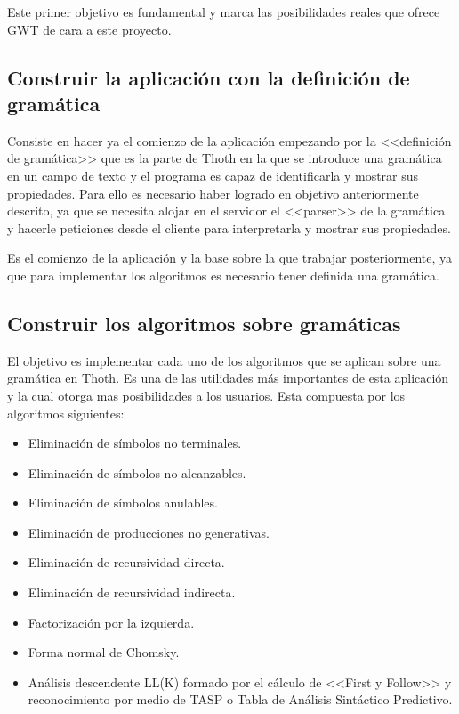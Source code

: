 Este primer objetivo es fundamental y marca las posibilidades reales que ofrece GWT de cara a este proyecto.

\subsection{Construir la aplicación con la definición de gramática}

Consiste en hacer ya el comienzo de la aplicación empezando por la <<definición de gramática>> que es la parte de Thoth en la que se introduce una gramática en un campo de texto y el programa es capaz de identificarla y mostrar sus propiedades. Para ello es necesario haber logrado en objetivo anteriormente descrito, ya que se necesita alojar en el servidor el <<parser>> de la gramática y hacerle peticiones desde el cliente para interpretarla y mostrar sus propiedades.

Es el comienzo de la aplicación y la base sobre la que trabajar posteriormente, ya que para implementar los algoritmos es necesario tener definida una gramática.

\subsection{Construir los algoritmos sobre gramáticas}

El objetivo es implementar cada uno de los algoritmos que se aplican sobre una gramática en Thoth. Es una de las utilidades más importantes de esta aplicación y la cual otorga mas posibilidades a los usuarios. Esta compuesta por los algoritmos siguientes:

\begin{itemize}
\item Eliminación de símbolos no terminales.
\item Eliminación de símbolos no alcanzables. 
\item Eliminación de símbolos anulables.
\item Eliminación de producciones no generativas.
\item Eliminación de recursividad directa.
\item Eliminación de recursividad indirecta.
\item Factorización por la izquierda.
\item Forma normal de Chomsky.
\item Análisis descendente LL(K) formado por el cálculo de <<First y Follow>> y reconocimiento por medio de TASP o Tabla de Análisis Sintáctico Predictivo.
\end{itemize}

